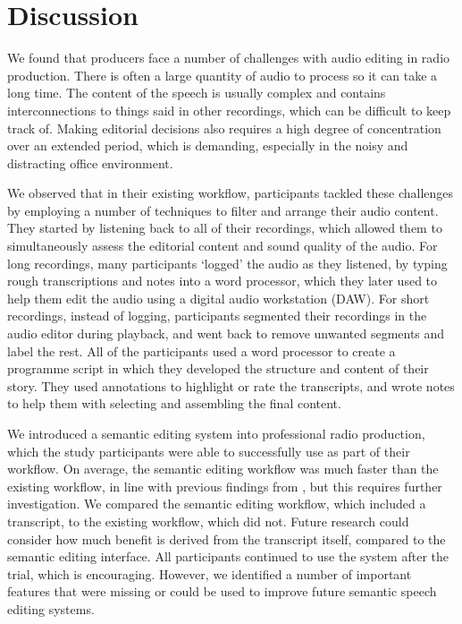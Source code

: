 

\section{Discussion}\label{sec:discussion}
We found that producers face a number of challenges with audio editing in radio production. There is often a large
quantity of audio to process so it can take a long time. The content of the speech is usually complex and contains
interconnections to things said in other recordings, which can be difficult to keep track of. Making editorial
decisions also requires a high degree of concentration over an extended period, which is demanding, especially in the
noisy and distracting office environment.

We observed that in their existing workflow, participants tackled these challenges by employing a number of techniques
to filter and arrange their audio content. They started by listening back to all of their recordings, which allowed
them to simultaneously assess the editorial content and sound quality of the audio. For long recordings, many
participants `logged' the audio as they listened, by typing rough transcriptions and notes into a word processor, which
they later used to help them edit the audio using a digital audio workstation (DAW). For short recordings, instead of
logging, participants segmented their recordings in the audio editor during playback, and went back to remove unwanted
segments and label the rest.
All of the participants used a word processor to create a programme script in which they developed the structure and
content of their story. They used annotations to highlight or rate the transcripts, and wrote notes to help them with
selecting and assembling the final content.

We introduced a semantic editing system into professional radio production, which the study participants were able
to successfully use as part of their workflow. On average, the semantic editing workflow was much faster than the
existing workflow, in line with previous findings from \citet{Whittaker2004}, but this requires further investigation.
We compared the semantic editing workflow, which included a transcript, to the existing workflow, which did not. Future
research could consider how much benefit is derived from the transcript itself, compared to the semantic editing
interface.  All participants continued to use the system after the trial, which is encouraging. However, we
identified a number of important features that were missing or could be used to improve future semantic speech editing
systems.

